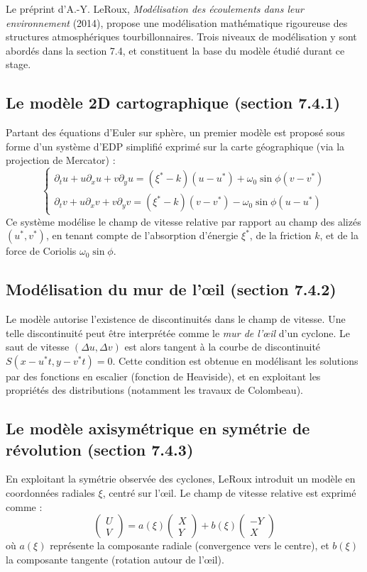 Le préprint d’A.-Y. LeRoux, \textit{Modélisation des écoulements dans leur environnement} (2014), propose une modélisation mathématique rigoureuse des structures atmosphériques tourbillonnaires. Trois niveaux de modélisation y sont abordés dans la section 7.4, et constituent la base du modèle étudié durant ce stage.

\subsection{Le modèle 2D cartographique (section 7.4.1)}

Partant des équations d’Euler sur sphère, un premier modèle est proposé sous forme d’un système d’EDP simplifié exprimé sur la carte géographique (via la projection de Mercator) :
\[
\begin{cases}
\partial_t u + u \partial_x u + v \partial_y u = (\xi^* - k)(u - u^*) + \omega_0 \sin\phi (v - v^*) \\
\partial_t v + u \partial_x v + v \partial_y v = (\xi^* - k)(v - v^*) - \omega_0 \sin\phi (u - u^*)
\end{cases}
\]
Ce système modélise le champ de vitesse relative par rapport au champ des alizés \( (u^*, v^*) \), en tenant compte de l’absorption d’énergie \( \xi^* \), de la friction \( k \), et de la force de Coriolis \( \omega_0 \sin\phi \).

\subsection{Modélisation du mur de l’œil (section 7.4.2)}

Le modèle autorise l’existence de discontinuités dans le champ de vitesse. Une telle discontinuité peut être interprétée comme le \textit{mur de l’œil} d’un cyclone. Le saut de vitesse \( (\Delta u, \Delta v) \) est alors tangent à la courbe de discontinuité \( S(x - u^*t, y - v^*t) = 0 \). Cette condition est obtenue en modélisant les solutions par des fonctions en escalier (fonction de Heaviside), et en exploitant les propriétés des distributions (notamment les travaux de Colombeau).

\subsection{Le modèle axisymétrique en symétrie de révolution (section 7.4.3)}

En exploitant la symétrie observée des cyclones, LeRoux introduit un modèle en coordonnées radiales \( \xi \), centré sur l’œil. Le champ de vitesse relative est exprimé comme :
\[
\begin{pmatrix}
U \\
V
\end{pmatrix}
=
a(\xi)
\begin{pmatrix}
X \\
Y
\end{pmatrix}
+
b(\xi)
\begin{pmatrix}
- Y \\
X
\end{pmatrix}
\]
où \( a(\xi) \) représente la composante radiale (convergence vers le centre), et \( b(\xi) \) la composante tangente (rotation autour de l’œil).

